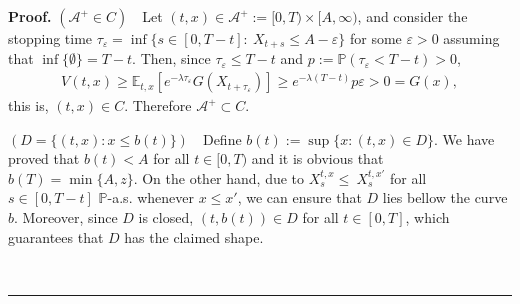 \documentclass{tufte-handout}
\renewcommand{\Pr}{\mathbb{P}} %
\newenvironment{pf}[1][Proof]{\textbf{#1.} }{\ \rule{0.5em}{0.5em}}
\begin{document}
	\begin{pf}
	$(\mathcal{A}^+ \in C)$\ \ Let $(t, x)\in \mathcal{A}^+ := [0, T)\times[A, \infty)$, and consider the stopping time $\tau_\varepsilon = \inf\{s\in[0, T - t] :\ X_{t + s} \leq A - \varepsilon\}$ for some $\varepsilon > 0$ assuming that $\inf\{\emptyset\} = T - t$. Then, since $\tau_{\varepsilon} \leq T - t$ and $p := \mathbb{P}(\tau_\varepsilon < T - t) > 0$,
	\begin{align*}
		V(t, x) \geq \mathbb{E}_{t, x}\left[e^{-\lambda\tau_{\varepsilon}}G(X_{t + \tau_{\varepsilon}})\right] \geq e^{-\lambda(T - t)}p\varepsilon > 0 = G(x),
	\end{align*}
	this is, $(t, x)\in C$. Therefore $\mathcal{A}^+ \subset C$.	\\ \vspace{0.3cm}
	
	$(D = \{(t, x) : x \leq b(t)\})$\ \ Define $b(t) := \sup\{x : (t, x) \in D\}$. We have proved that $b(t) < A$ for all $t\in[0, T)$ and it is obvious that $b(T) = \min\{A, z\}$. On the other hand, due to $X_s^{t, x} \leq\ X_s^{t, x'}$ for all $s\in [0, T - t]$ $\Pr$-a.s. whenever $x \leq x'$, we can ensure that $D$ lies bellow the curve $b$. Moreover, since $D$ is closed, $(t, b(t)) \in D$ for all $t\in[0, T]$, which guarantees that $D$ has the claimed shape. \\  \vspace{0.3cm}
	

\end{pf}
\end{document}
